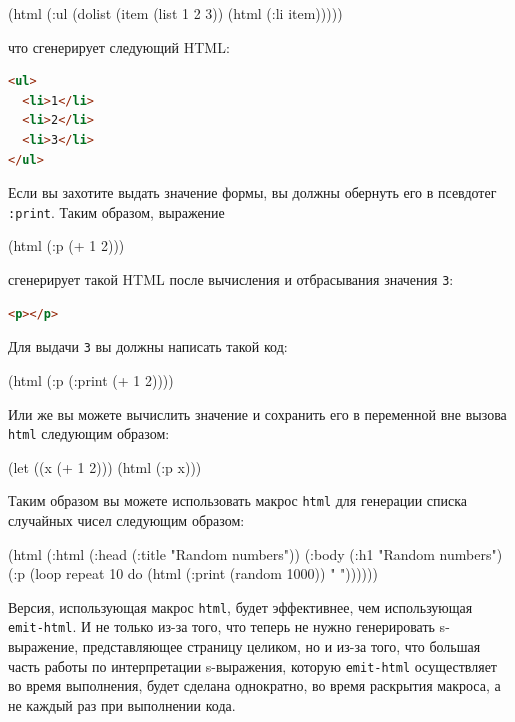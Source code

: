\begin{myverb}
(html (:ul (dolist (item (list 1 2 3)) (html (:li item)))))
\end{myverb}

\noindent{}что сгенерирует следующий HTML:

\begin{lstlisting}[language=HTML]
<ul>
  <li>1</li>
  <li>2</li>
  <li>3</li>
</ul>
\end{lstlisting}

Если вы захотите выдать значение формы, вы должны обернуть его в псевдотег
\lstinline{:print}. Таким образом, выражение

\begin{myverb}
(html (:p (+ 1 2)))
\end{myverb}

\noindent{}сгенерирует такой HTML после вычисления и отбрасывания значения \lstinline{3}:

\begin{lstlisting}[language=HTML]
<p></p>
\end{lstlisting}

Для выдачи \lstinline{3} вы должны написать такой код:

\begin{myverb}
(html (:p (:print (+ 1 2))))
\end{myverb}

Или же вы можете вычислить значение и сохранить его в переменной вне вызова \lstinline{html}
следующим образом:

\begin{myverb}
(let ((x (+ 1 2))) (html (:p x)))
\end{myverb}

Таким образом вы можете использовать макрос \lstinline{html} для генерации списка случайных
чисел следующим образом:

\begin{myverb}
(html
  (:html
    (:head
      (:title "Random numbers"))
    (:body 
      (:h1 "Random numbers")
      (:p (loop repeat 10 do (html (:print (random 1000)) " "))))))
\end{myverb}

Версия, использующая макрос \lstinline{html}, будет эффективнее, чем использующая
\lstinline{emit-html}. И не только из-за того, что теперь не нужно генерировать s-выражение,
представляющее страницу целиком, но и из-за того, что большая часть работы по
интерпретации s-выражения, которую \lstinline{emit-html} осуществляет во время выполнения,
будет сделана однократно, во время раскрытия макроса, а не каждый раз при выполнении кода.

